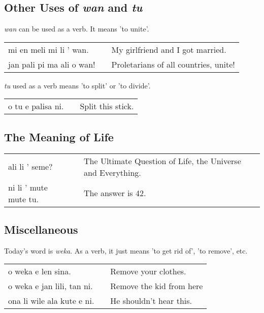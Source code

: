 \subsection*{Other Uses of \textit{wan} and \textit{tu}}
%
%
\textit{wan} can be used as a verb. 
It means 'to unite'. 

\begin{supertabular}{p{5,5cm}|ll}
mi en meli mi li ' wan. && My girlfriend and I got married. \\
jan pali pi ma ali o wan! && Proletarians of all countries, unite! \\

\end{supertabular} 

\textit{tu} used as a verb means 'to split' or 'to divide'. 

\begin{supertabular}{p{5,5cm}|ll}
o tu e palisa ni. && Split this stick.  \\
\end{supertabular} 

%
\subsection*{The Meaning of Life}
%

\begin{supertabular}{p{5,5cm}|ll}
ali li ' seme? &&  The Ultimate Question of Life, the Universe and Everything. \\
ni li ' mute mute tu.  && The answer is 42. \\
\end{supertabular} 
%
%
%
\newpage
%
\subsection*{Miscellaneous}
%
%
Today's word is \textit{weka}. 
As a verb, it just means 'to get rid of', 'to remove', etc. 

\begin{supertabular}{p{5,5cm}|ll}
o weka e len sina. && Remove your clothes. \\
o weka e jan lili, tan ni. && Remove the kid from here \\ 
ona li wile ala kute e ni. && He shouldn't hear this. \\ 
\end{supertabular} 

